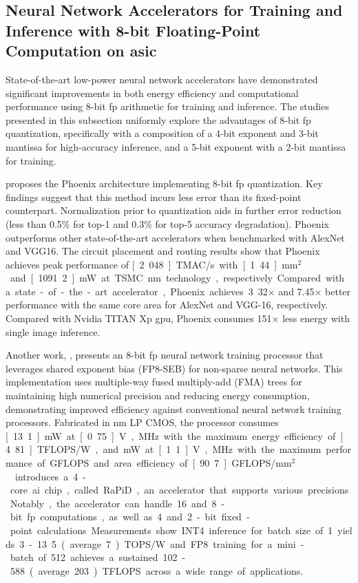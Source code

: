 \subsection{Neural Network Accelerators for Training and Inference with 8-bit Floating-Point Computation on \gls{asic}
}
State-of-the-art low-power neural network accelerators have demonstrated significant improvements in both energy efficiency and computational performance using 8-bit \gls{fp} arithmetic for training and inference. The studies presented in this subsection uniformly explore the advantages of 8-bit \gls{fp} quantization, specifically with a composition of a 4-bit exponent and 3-bit mantissa for high-accuracy inference, and a 5-bit exponent with a 2-bit mantissa for training.

\cite{wu2020phoenix} proposes the Phoenix architecture implementing 8-bit \gls{fp} quantization. Key findings suggest that this method incurs less error than its fixed-point counterpart. Normalization prior to quantization aids in further error reduction (less than 0.5\% for top-1 and 0.3\%
for top-5 accuracy degradation). Phoenix outperforms other state-of-the-art accelerators when benchmarked with AlexNet and VGG16. The circuit placement and routing results show that Phoenix achieves peak performance of \unit[2.048]{TMAC/s} with \unit[1.44]{mm$^2$} and \unit[1091.2]{mW} at TSMC \unit[28]{nm} technology, respectively. Compared with a state-of-the-art accelerator, Phoenix achieves 3.32$\times$ and 7.45$\times$ better performance with
the same core area for AlexNet and VGG-16, respectively.
Compared with Nvidia TITAN Xp \gls{gpu}, Phoenix consumes
151$\times$ less energy with single image inference.

Another work, \cite{park2021neural}, presents an 8-bit \gls{fp} neural network training processor that leverages shared exponent bias (FP8-SEB) for non-sparse neural networks. This implementation uses multiple-way fused multiply-add (FMA) trees for maintaining high numerical precision and reducing energy consumption, demonstrating improved efficiency against conventional neural network training processors. Fabricated in \unit[40]{nm} LP CMOS, the processor consumes
\unit[13.1]{mW} at \unit[0.75]{V}, \unit[20]{MHz} with the maximum energy efficiency of \unit[4.81]{TFLOPS/W}, and \unit[230]{mW} at \unit[1.1]{V}, \unit[180]{MHz} with the maximum performance of \unit[567]{GFLOPS} and area efficiency of \unit[90.7]{GFLOPS/mm$^2$}   .

\cite{venkataramani2021rapid} introduces a 4-core \gls{ai} chip, called RaPiD, an accelerator that supports various precisions. Notably, the accelerator can handle 16 and 8-bit \gls{fp} computations, as well as 4 and 2-bit fixed-point calculations. Measurements show INT4 inference for batch size of 1 yields 3 - 13.5 (average 7) TOPS/W and FP8 training for a mini-batch of 512 achieves a sustained 102 - 588 (average 203) TFLOPS across a wide range of applications.

